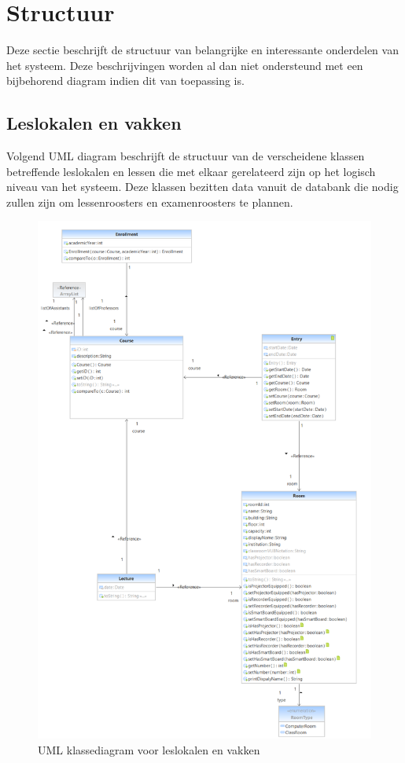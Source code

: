 \section{Structuur}
Deze sectie beschrijft de structuur van belangrijke en interessante onderdelen van het systeem. 
Deze beschrijvingen worden al dan niet ondersteund met een bijbehorend diagram indien dit van toepassing is.

\subsection{Leslokalen en vakken}
Volgend UML diagram beschrijft de structuur van de verscheidene klassen betreffende leslokalen en lessen die met elkaar gerelateerd zijn op het logisch niveau van het systeem.
Deze klassen bezitten data vanuit de databank die nodig zullen zijn om lessenroosters en examenroosters te plannen.

\begin{figure}[H]
	\centering
	\includegraphics[scale=0.4]{img/roomsAndCourses}
	\caption{UML klassediagram voor leslokalen en vakken}
	\label{fig:roomsAndCourses}
\end{figure}

